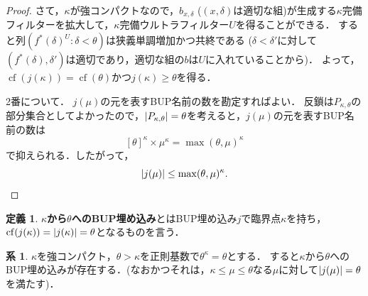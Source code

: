\documentclass[uplatex,dvipdfmx]{jsarticle}
\newcommand{\cf}{\operatorname{cf}}
\DeclarePairedDelimiter\abs{\lvert}{\rvert}
\theoremstyle{definition}
\newtheorem{defi}[thm]{定義}
\newtheorem{cor}[thm]{系}
\begin{document}
\begin{proof}
		さて，$\kappa$が強コンパクトなので，$b_{x, \delta}$ ($(x, \delta)$は適切な組)が生成する$\kappa$完備フィルターを拡大して，$\kappa$完備ウルトラフィルター$U$を得ることができる．
		すると列$(f^*(\delta)^U : \delta < \theta)$は狭義単調増加かつ共終である ($\delta < \delta'$に対して$(f^*(\delta), \delta')$は適切であり，適切な組の$b$は$U$に入れていることから)．
		よって，$\cf(j(\kappa)) = \cf(\theta)$かつ$j(\kappa) \ge \theta$を得る．

		2番について．
		$j(\mu)$の元を表すBUP名前の数を勘定すればよい．
		反鎖は$P_{\kappa,\theta}$の部分集合としてよかったので，$\abs{P_{\kappa,\theta}} = \theta$を考えると，$j(\mu)$の元を表すBUP名前の数は
		\[
			[\theta]^\kappa \times \mu^\kappa = \max(\theta, \mu)^\kappa
		\]
		で抑えられる．したがって，
		\[
		\abs{j(\mu)} \le \max(\theta, \mu)^\kappa.
		\]
	\end{proof}

	\begin{defi}
		\textbf{$\kappa$から$\theta$へのBUP埋め込み}とはBUP埋め込み$j$で臨界点$\kappa$を持ち，$\cf(j(\kappa)) = \abs{j(\kappa)} = \theta$となるものを言う．
	\end{defi}

	\begin{cor}\label{cor:embed}
		$\kappa$を強コンパクト，$\theta > \kappa$を正則基数で$\theta^\kappa = \theta$とする．
		すると$\kappa$から$\theta$へのBUP埋め込みが存在する．(なおかつそれは，$\kappa \le \mu \le \theta$なる$\mu$に対して$\abs{j(\mu)} = \theta$を満たす)．
	\end{cor}
\end{document}
